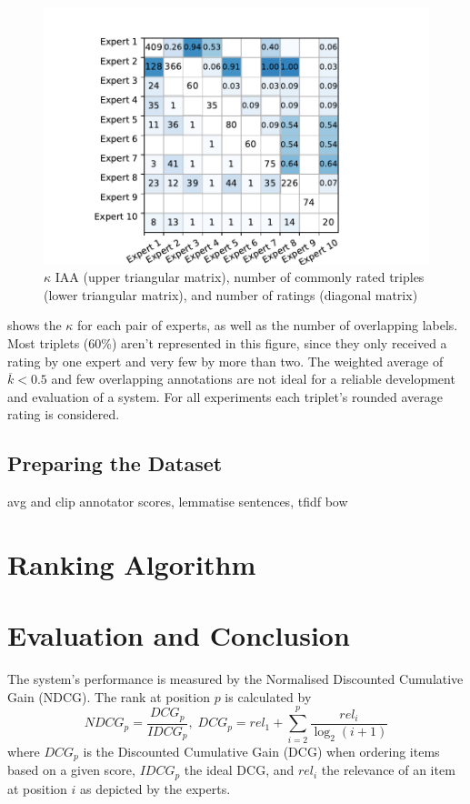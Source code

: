\begin{figure}
	\includegraphics[width=\linewidth]{iaa}
	\caption{$\kappa$ IAA (upper triangular matrix), number of commonly rated triples (lower triangular matrix), and number of ratings (diagonal matrix)}
	\label{fig:iaa}
\end{figure}

 shows the $\kappa$ for each pair of experts, as well as the number of overlapping labels. Most triplets (60\%) aren't represented in this figure, since they only received a rating by one expert and very few by more than two. The weighted average of $\overline{k}<0.5$ and few overlapping annotations are not ideal for a reliable development and evaluation of a system. For all experiments each triplet's rounded average rating is considered.

\subsection{Preparing the Dataset}

avg and clip annotator scores, lemmatise sentences, tfidf bow

\section{Ranking Algorithm}

\section{Evaluation and Conclusion}
The system's performance is measured by the Normalised Discounted Cumulative Gain (NDCG). The rank at position $p$ is calculated by
\begin{equation}
NDCG_p = \frac{DCG_p}{IDCG_p},\;
DCG_p = rel_1 + \sum_{i=2}^{p} \frac{rel_i}{\log_2(i+1)}
\end{equation}
where $DCG_p$ is the Discounted Cumulative Gain (DCG) when ordering items based on a given score, $IDCG_p$ the ideal DCG, and $rel_i$ the relevance of an item at position $i$ as depicted by the experts.

